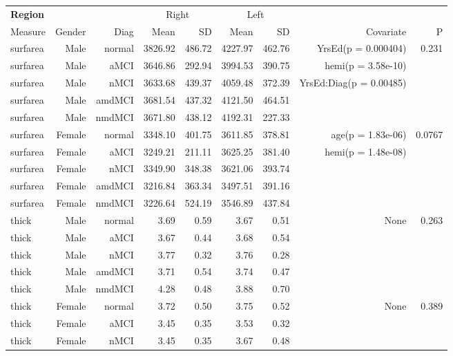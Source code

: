 \documentclass[12pt]{article}\usepackage[]{graphicx}\usepackage[]{color}
\newcommand\T{\rule{0pt}{2.6ex}}
\newcommand\B{\rule[-1.2ex]{0pt}{0pt}}
\begin{document}
\newpage
\begin{sidewaystable}
  \centering
	\footnotesize
	\begin{tabular}{l|rr|rr|rr|rr}
	\hline
	\textbf{Region} & & & \multicolumn{2}{c}{Right} \T & \multicolumn{2}{|c}{Left} & & \\
	\multicolumn{1}{l|}{Measure} \T\B & Gender & Diag & Mean & SD & Mean & SD & Covariate & P \\
	\hline\hline
 surfarea & Male & normal & 3826.92 & 486.72 & 4227.97 & 462.76 & YrsEd(p = 0.000404) & 0.231 \\ 
  surfarea & Male & aMCI & 3646.86 & 292.94 & 3994.53 & 390.75 & hemi(p = 3.58e-10) &  \\ 
  surfarea & Male & nMCI & 3633.68 & 439.37 & 4059.48 & 372.39 & YrsEd:Diag(p = 0.00485) &  \\ 
  surfarea & Male & amdMCI & 3681.54 & 437.32 & 4121.50 & 464.51 &  &  \\ 
  surfarea & Male & nmdMCI & 3671.80 & 438.12 & 4192.31 & 227.33 &  &  \\ 
   \hline
surfarea & Female & normal & 3348.10 & 401.75 & 3611.85 & 378.81 & age(p = 1.83e-06) & 0.0767 \\ 
  surfarea & Female & aMCI & 3249.21 & 211.11 & 3625.25 & 381.40 & hemi(p = 1.48e-08) &  \\ 
  surfarea & Female & nMCI & 3349.90 & 348.38 & 3621.06 & 393.74 &  &  \\ 
  surfarea & Female & amdMCI & 3216.84 & 363.34 & 3497.51 & 391.16 &  &  \\ 
  surfarea & Female & nmdMCI & 3226.64 & 524.19 & 3546.89 & 437.84 &  &  \\ 
   \hline
thick & Male & normal & 3.69 & 0.59 & 3.67 & 0.51 & None & 0.263 \\ 
  thick & Male & aMCI & 3.67 & 0.44 & 3.68 & 0.54 &  &  \\ 
  thick & Male & nMCI & 3.77 & 0.32 & 3.76 & 0.28 &  &  \\ 
  thick & Male & amdMCI & 3.71 & 0.54 & 3.74 & 0.47 &  &  \\ 
  thick & Male & nmdMCI & 4.28 & 0.48 & 3.88 & 0.70 &  &  \\ 
   \hline
thick & Female & normal & 3.72 & 0.50 & 3.75 & 0.52 & None & 0.389 \\ 
  thick & Female & aMCI & 3.45 & 0.35 & 3.53 & 0.32 &  &  \\ 
  thick & Female & nMCI & 3.45 & 0.35 & 3.67 & 0.48 &  &  \\ 

\end{tabular}
\end{sidewaystable}
\end{document}
